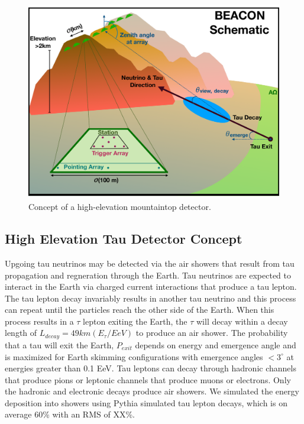 \documentclass{PoS}
\begin{document}
\begin{figure}[htbp]
\begin{center}
\includegraphics[width=\textwidth]{figures/BEACON_ICRC_Concept.pdf}
\caption{Concept of a high-elevation mountaintop detector.}
\label{fig:concept}
\end{center}
\end{figure}

\subsection{High Elevation Tau Detector Concept}

Upgoing tau neutrinos may be detected via the air showers that result from tau propagation and regneration through the Earth. Tau neutrinos are expected to interact in the Earth via charged current interactions that produce a tau lepton.%
The tau lepton decay invariably results in another tau neutrino and this process can repeat until the particles reach the other side of the Earth. When this process results in a $\tau$ lepton exiting the Earth, the $\tau$ will decay within a decay length of $L_{decay} = 49 km (E_\tau/EeV)$ to produce an air shower. The probability that a tau will exit the Earth, $P_{exit}$ depends on energy and emergence angle and is maximized for Earth skimming configurations with emergence angles $<3^{\circ}$ at energies greater than 0.1 EeV.  Tau leptons can decay through hadronic channels that produce pions or leptonic channels that produce muons or electrons. Only the hadronic and electronic decays produce air showers. We simulated the energy deposition into showers using Pythia simulated tau lepton decays, which is on average 60\% with an RMS of XX\%. 
\end{document}
